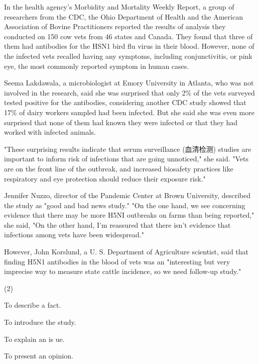 \documentclass{英语试卷}
\begin{document}
\par In the health agency's Morbidity and Mortality Weekly Report, a group of researchers from the CDC, the Ohio Department of Health and the American Association of Bovine Practitioners reported the results of analysis they conducted on 150 cow vets from 46 states and Canada. They found that three of them had antibodies for the HSN1 bird flu virus in their blood. However, none of the infected vets recalled having any symptoms, including conjunctivitis, or pink eye, the most commonly reported symptom in human cases.\par
\par Seema Lakdawala, a microbiologist at Emory University in Atlanta, who was not involved in the research, said she was surprised that only 2\% of the vets surveyed tested positive for the antibodies, considering another CDC study showed that 17\% of dairy workers sampled had been infected. But she said she was even more surprised that none of them had known they were infected or that they had worked with infected animals.\par
\par "These surprising results indicate that serum surveillance (血清检测) studies are important to inform risk of infections that are going unnoticed," she said. "Vets are on the front line of the outbreak, and increased biosafety practices like respiratory and eye protection should reduce their exposure risk."\par
\par Jennifer Nuzzo, director of the Pandemic Center at Brown University, described the study as "good and bad news study." "On the one hand, we see concerning evidence that there may be more H5NI outbreaks on farms than being reported," she said, "On the other hand, I'm reassured that there isn't evidence that infections among vets have been widespread."\par
\par However, John Korslund, a U. S. Department of Agriculture scientist, said that finding H5N1 antibodies in the blood of vets was an "interesting but very imprecise way to measure state cattle incidence, so we need follow-up study."\par
{}
\begin{choices}(2)
  \item To describe a fact.
  \item To introduce the study.
  \item To explain an is ue.
  \item To present an opinion.
\end{choices}
\end{document}
